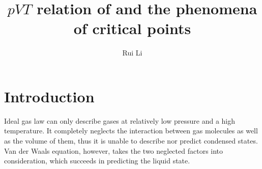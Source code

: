 \documentclass[%
 reprint,
 amsmath,amssymb,
 aps,
10.5pt,
]{revtex4-1}
\begin{document}

\title{$pVT$ relation of  and the phenomena of critical points }%

\author{Rui Li}
%





\maketitle

\section{Introduction}
Ideal gas law can only describe gases at relatively low pressure and a high temperature. It completely neglects the interaction between gas molecules as well as the volume of them, thus it is unable to describe nor predict condensed states. Van der Waals equation, however, takes the two neglected factors into consideration, which succeeds in predicting the liquid state. 
\end{document}
